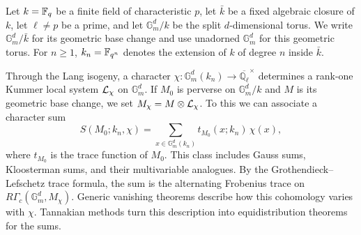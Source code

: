 \documentclass[12pt,reqno]{amsart}
\theoremstyle{definition}
\theoremstyle{plain}
\theoremstyle{definition}
\theoremstyle{remark}
\newcommand{\bbG}{\mathbb{G}}  \newcommand{\bbH}{\mathbb{H}}
\newcommand{\bbQ}{\mathbb{Q}}  \newcommand{\bbR}{\mathbb{R}}
\newcommand{\ol}[1]{\overline{#1}}
\newcommand{\Ql}{\bbQ_{\ell}}
\newcommand{\Gm}{\bbG_m}
\begin{document}
Let \(k=\mathbb{F}_q\) be a finite field of characteristic \(p\), let \(\bar k\) be a fixed algebraic closure of
\(k\), let \(\ell\neq p\) be a prime, and let \(\Gm^d/k\) be the split \(d\)-dimensional torus.  We write
\(\Gm^d/\bar k\) for its geometric base change and use unadorned \(\Gm^d\) for this geometric torus.
For \(n\ge1\), \(k_n=\mathbb{F}_{q^n}\) denotes the extension of \(k\) of degree \(n\) inside \(\bar k\).

Through the Lang isogeny, a character
\(\chi:\Gm^d(k_n)\to\ol\Ql^\times\) determines a rank-one Kummer local system \(\mathcal{L}_\chi\) on
\(\Gm^d\).  If \(M_0\) is perverse on \(\Gm^d/k\) and \(M\) is its geometric base change, we set
\(M_\chi=M\otimes\mathcal{L}_\chi\).  To this we can associate a character sum
\[
        S(M_0;k_n,\chi)=\sum_{x\in \Gm^d(k_n)}t_{M_0}(x;k_n)\,\chi(x),
\]
where \(t_{M_0}\) is the trace function of \(M_0\).  This class includes Gauss sums, Kloosterman sums,
and their multivariable analogues.  By the Grothendieck--Lefschetz trace formula, the sum is the
alternating Frobenius trace on \(R\Gamma_c(\Gm^d,M_\chi)\).  Generic vanishing theorems describe how this
cohomology varies with \(\chi\).  Tannakian methods turn this description into equidistribution theorems
for the sums.
\end{document}

